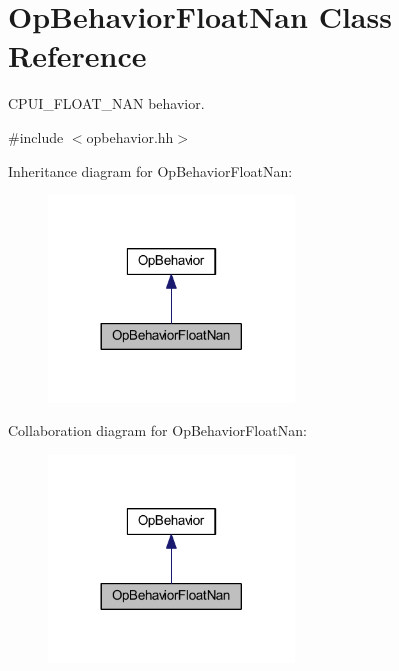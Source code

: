 \hypertarget{class_op_behavior_float_nan}{}\section{Op\+Behavior\+Float\+Nan Class Reference}
\label{class_op_behavior_float_nan}


C\+P\+U\+I\+\_\+\+F\+L\+O\+A\+T\+\_\+\+N\+AN behavior.  




{\ttfamily \#include $<$opbehavior.\+hh$>$}



Inheritance diagram for Op\+Behavior\+Float\+Nan\+:
\nopagebreak
\begin{figure}[H]
\begin{center}
\leavevmode
\includegraphics[width=185pt]{class_op_behavior_float_nan__inherit__graph}
\end{center}
\end{figure}


Collaboration diagram for Op\+Behavior\+Float\+Nan\+:
\nopagebreak
\begin{figure}[H]
\begin{center}
\leavevmode
\includegraphics[width=185pt]{class_op_behavior_float_nan__coll__graph}
\end{center}
\end{figure}
